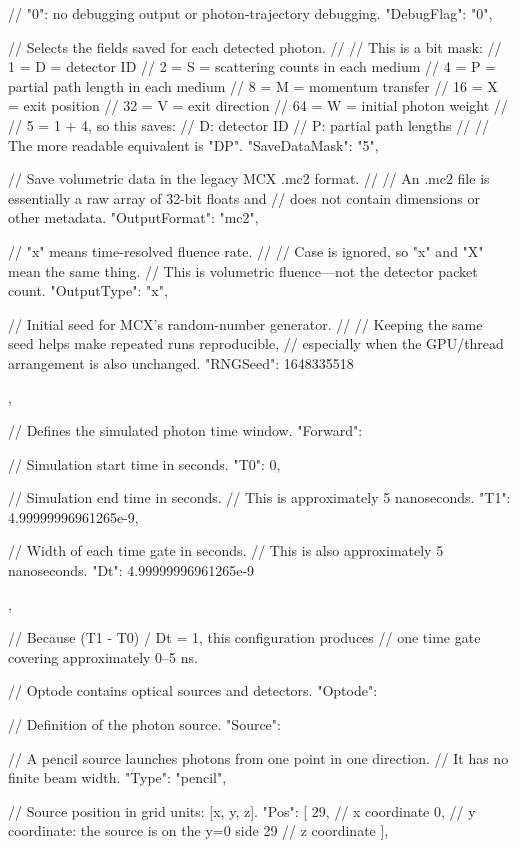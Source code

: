{{    // "0": no debugging output or photon-trajectory debugging.
    "DebugFlag": "0",

    // Selects the fields saved for each detected photon.
    //
    // This is a bit mask:
    //   1 = D = detector ID
    //   2 = S = scattering counts in each medium
    //   4 = P = partial path length in each medium
    //   8 = M = momentum transfer
    //  16 = X = exit position
    //  32 = V = exit direction
    //  64 = W = initial photon weight
    //
    // 5 = 1 + 4, so this saves:
    //   D: detector ID
    //   P: partial path lengths
    //
    // The more readable equivalent is "DP".
    "SaveDataMask": "5",

    // Save volumetric data in the legacy MCX .mc2 format.
    //
    // An .mc2 file is essentially a raw array of 32-bit floats and
    // does not contain dimensions or other metadata.
    "OutputFormat": "mc2",

    // "x" means time-resolved fluence rate.
    //
    // Case is ignored, so "x" and "X" mean the same thing.
    // This is volumetric fluence—not the detector packet count.
    "OutputType": "x",

    // Initial seed for MCX's random-number generator.
    //
    // Keeping the same seed helps make repeated runs reproducible,
    // especially when the GPU/thread arrangement is also unchanged.
    "RNGSeed": 1648335518
  },

  // Defines the simulated photon time window.
  "Forward": {

    // Simulation start time in seconds.
    "T0": 0,

    // Simulation end time in seconds.
    // This is approximately 5 nanoseconds.
    "T1": 4.99999996961265e-9,

    // Width of each time gate in seconds.
    // This is also approximately 5 nanoseconds.
    "Dt": 4.99999996961265e-9
  },

  // Because (T1 - T0) / Dt = 1, this configuration produces
  // one time gate covering approximately 0–5 ns.

  // Optode contains optical sources and detectors.
  "Optode": {

    // Definition of the photon source.
    "Source": {

      // A pencil source launches photons from one point in one direction.
      // It has no finite beam width.
      "Type": "pencil",

      // Source position in grid units: [x, y, z].
      "Pos": [
        29, // x coordinate
        0,  // y coordinate: the source is on the y=0 side
        29  // z coordinate
      ],

}}}
